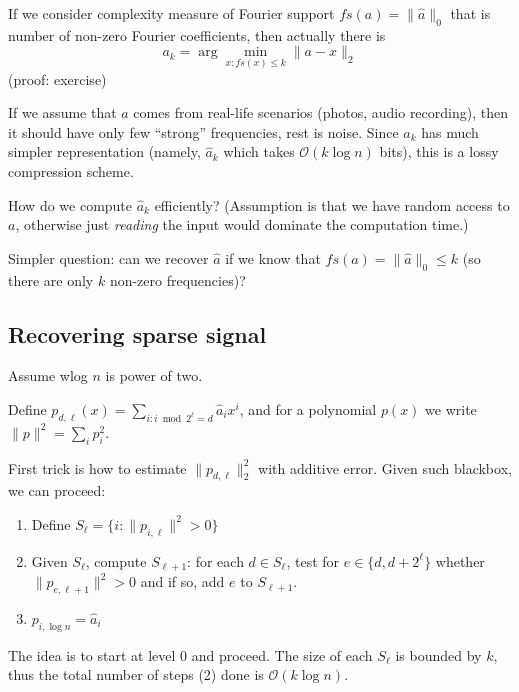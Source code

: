 \documentclass[11pt]{article}
\newcommand{\bigo}{\mathcal{O}}
\begin{document}
If we consider complexity measure of Fourier support $fs(a) = \|\hat{a}\|_0$ that is number of non-zero Fourier coefficients, then actually there is
$$ a_k = \arg \min_{x : fs(x) \le k} \|a - x\|_2$$
(proof: exercise)

If we assume that $a$ comes from real-life scenarios (photos, audio recording), then it should have only few ``strong'' frequencies, rest is noise. Since $a_k$ has much simpler representation (namely, $\hat{a}_k$ which takes $\bigo(k \log n)$ bits), this is a lossy compression scheme.

How do we compute $\hat{a}_k$ efficiently? (Assumption is that we have random access to $a$, otherwise just \emph{reading} the input would dominate the computation time.)

Simpler question: can we recover $\hat{a}$ if we know that $fs(a) = \|\hat{a}\|_0 \le k$ (so there are only $k$ non-zero frequencies)?

\subsection{Recovering sparse signal}
Assume wlog $n$ is power of two.

Define $p_{d,\ell}(x) = \sum_{i : i \bmod 2^{\ell} = d} \hat{a}_i x^i$, and for a polynomial $p(x)$ we write $\|p\|^2 = \sum_i p_i^2$.

First trick is how to estimate $\|p_{d,\ell}\|_2^2$ with additive error. Given such blackbox, we can proceed:
\begin{enumerate}
\item Define $S_{\ell} = \{i : \|p_{i,\ell}\|^2 > 0 \}$
\item Given $S_{\ell}$, compute $S_{\ell+1}$: for each $d \in S_{\ell}$, test for $e \in \{d, d+2^{\ell}\}$ whether $\|p_{e,\ell+1}\|^2 > 0$ and if so, add $e$ to $S_{\ell+1}$.
\item $p_{i,\log n} = \hat{a}_i$
\end{enumerate}

The idea is to start at level 0 and proceed. The size of each $S_{\ell}$ is bounded by $k$, thus the total number of steps (2) done is $\bigo(k \log n)$.



\end{document}
